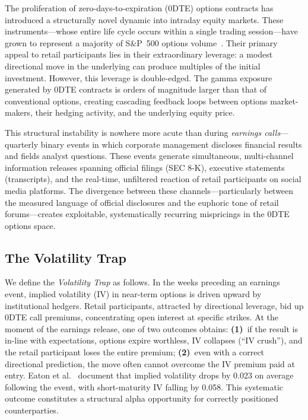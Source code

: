 \documentclass[10pt,twocolumn]{article}
\begin{document}
The proliferation of zero-days-to-expiration (0DTE) options contracts has
introduced a structurally novel dynamic into intraday equity markets. These
instruments---whose entire life cycle occurs within a single trading
session---have grown to represent a majority of S\&P~500 options volume~\cite{cboe2024}.
Their primary appeal to retail participants lies in their extraordinary
leverage: a modest directional move in the underlying can produce multiples of
the initial investment. However, this leverage is double-edged. The gamma
exposure generated by 0DTE contracts is orders of magnitude larger than that of
conventional options, creating cascading feedback loops between options
market-makers, their hedging activity, and the underlying equity price.

This structural instability is nowhere more acute than during \emph{earnings
calls}---quarterly binary events in which corporate management discloses
financial results and fields analyst questions. These events generate
simultaneous, multi-channel information releases spanning official filings
(SEC 8-K), executive statements (transcripts), and the real-time, unfiltered
reaction of retail participants on social media platforms. The divergence
between these channels---particularly between the measured language of official
disclosures and the euphoric tone of retail forums---creates exploitable,
systematically recurring mispricings in the 0DTE options space.

\subsection{The Volatility Trap}

We define the \emph{Volatility Trap} as follows. In the weeks preceding an
earnings event, implied volatility (IV) in near-term options is driven upward
by institutional hedgers. Retail participants, attracted by directional
leverage, bid up 0DTE call premiums, concentrating open interest at specific
strikes. At the moment of the earnings release, one of two outcomes obtains:
\textbf{(1)}~if the result is in-line with expectations, options expire
worthless, IV collapses (``IV crush''), and the retail participant loses the
entire premium; \textbf{(2)}~even with a correct directional prediction, the
move often cannot overcome the IV premium paid at entry. Eaton et al.~\cite{eaton2026}
document that implied volatility drops by 0.023 on average following the event,
with short-maturity IV falling by 0.058. This systematic outcome constitutes a
structural alpha opportunity for correctly positioned counterparties.
\end{document}
